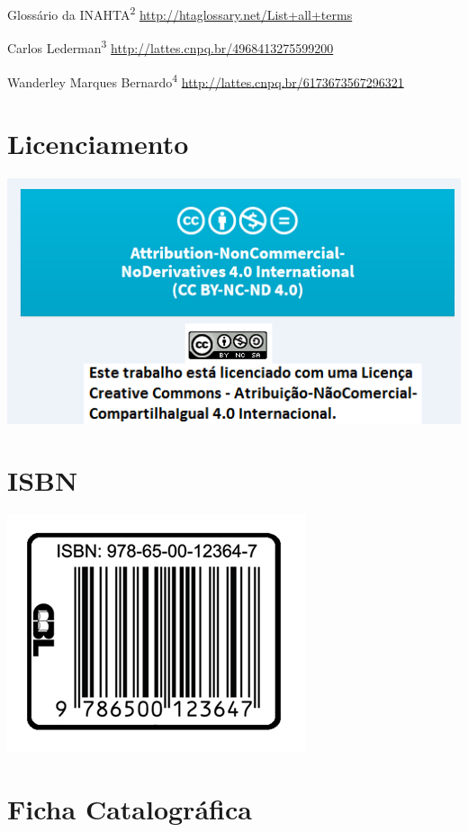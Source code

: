 \documentclass[
  openany]{book}
\begin{document}
Glossário da INAHTA\textsuperscript{2}
\url{http://htaglossary.net/List+all+terms}

Carlos Lederman\textsuperscript{3}
\url{http://lattes.cnpq.br/4968413275599200}

Wanderley Marques Bernardo\textsuperscript{4}
\url{http://lattes.cnpq.br/6173673567296321}

\hypertarget{licenciamento}{%
\chapter*{Licenciamento}\label{licenciamento}}

\begin{center}\includegraphics[width=height=4in,width=3in]{licenca_isbn} \end{center}

\hypertarget{isbn}{%
\chapter*{ISBN}\label{isbn}}

\begin{center}\includegraphics[width=height=4in,width=3in]{isbnv2} \end{center}

\hypertarget{ficha-catalogruxe1fica}{%
\chapter*{Ficha Catalográfica}\label{ficha-catalogruxe1fica}}

  
\end{document}
